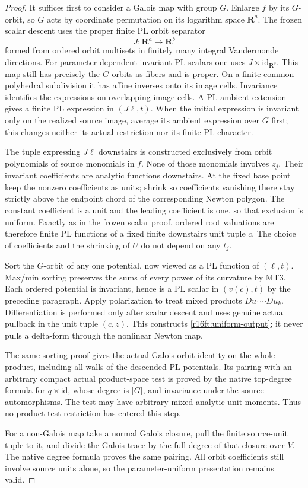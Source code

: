 \begin{proof}
It suffices first to consider a Galois map with group $G$. Enlarge $f$
by its $G$-orbit, so $G$ acts by coordinate permutation on its logarithm
space $\mathbf R^a$. The frozen scalar descent uses the proper finite
PL orbit separator
\[
 J:\mathbf R^a\longrightarrow\mathbf R^b
\]
formed from ordered orbit multisets in finitely many integral
Vandermonde directions. For parameter-dependent invariant PL scalars
one uses $J\times\mathrm{id}_{\mathbf R^s}$. This map still has
precisely the $G$-orbits as fibers and is proper. On a finite common
polyhedral subdivision it has affine inverses onto its image cells.
Invariance identifies the expressions on overlapping image cells.
A PL ambient extension gives a finite PL expression in $(J\ell,t)$.
When the initial expression is invariant only on the realized source
image, average its ambient expression over $G$ first; this changes
neither its actual restriction nor its finite PL character.

The tuple expressing $J\ell$ downstairs is constructed exclusively
from orbit polynomials of source monomials in $f$. None of those
monomials involves $z_j$. Their invariant coefficients are analytic
functions downstairs. At the fixed base point keep the nonzero
coefficients as units; shrink so coefficients vanishing there stay
strictly above the endpoint chord of the corresponding Newton polygon.
The constant coefficient is a unit and the leading coefficient is one,
so that exclusion is uniform. Exactly as in the frozen scalar proof,
ordered root valuations are therefore finite PL functions of a fixed
finite downstairs unit tuple $c$. The choice of coefficients and the
shrinking of $U$ do not depend on any $t_j$.

Sort the $G$-orbit of any one potential, now viewed as a PL function
of $(\ell,t)$. Max/min sorting preserves the sums of every power of
its curvature by MT3. Each ordered potential is invariant, hence is a
PL scalar in $(v(c),t)$ by the preceding paragraph. Apply polarization
to treat mixed products $Du_1\cdots Du_k$. Differentiation is performed
only after scalar descent and uses genuine actual pullback in the
unit tuple $(c,z)$. This constructs \eqref{r16ft:uniform-output}; it
never pulls a delta-form through the nonlinear Newton map.

The same sorting proof gives the actual Galois orbit identity on the
whole product, including all walls of the descended PL potentials.
Its pairing with an arbitrary compact actual product-space test is
proved by the native top-degree formula for $q\times\mathrm{id}$,
whose degree is $|G|$, and invariance under the source automorphisms.
The test may have arbitrary mixed analytic unit moments. Thus no
product-test restriction has entered this step.

For a non-Galois map take a normal Galois closure, pull the finite
source-unit tuple to it, and divide the Galois trace by the full degree
of that closure over $V$. The native degree formula proves the same
pairing. All orbit coefficients still involve source units alone,
so the parameter-uniform presentation remains valid.
\end{proof}

